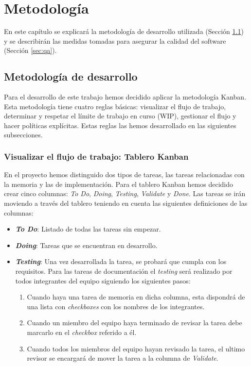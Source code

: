 \chapter{Metodología}\label{cap:metodologia}
En este capítulo se explicará la metodología de desarrollo utilizada (Sección \ref{cap:Kanban}) y se describirán las medidas tomadas para asegurar la calidad del software (Sección \ref{sec:qa}).

\section{Metodología de desarrollo}\label{cap:Kanban}
Para el desarrollo de este trabajo hemos decidido aplicar la metodología Kanban. Esta metodología tiene cuatro reglas básicas: visualizar el flujo de trabajo, determinar y respetar el límite de trabajo en curso (WIP), gestionar el flujo y hacer políticas explícitas. Estas reglas las hemos desarrollado en las siguientes subsecciones.

\subsection{Visualizar el flujo de trabajo: Tablero Kanban}\label{sec:flujoTrabajo}
En el proyecto hemos distinguido dos tipos de tareas, las tareas relacionadas con la memoria y las de implementación. Para el tablero Kanban hemos decidido crear cinco columnas: \textit{To Do}, \textit{Doing}, \textit{Testing}, \textit{Validate} y \textit{Done}.  Las tareas se irán moviendo a través del tablero teniendo en cuenta las siguientes definiciones de las columnas:
\begin{itemize}
  \item \textbf{\textit{To Do}}: Listado de todas las tareas sin empezar.
  \item \textbf{\textit{Doing}}: Tareas que se encuentran en desarrollo.
  \item \textbf{\textit{Testing}}: Una vez desarrollada la tarea, se probará que cumpla con los requisitos.
        Para las tareas de documentación el \textit{testing} será realizado por todos integrantes del equipo siguiendo los siguientes pasos:
        \begin{enumerate}
          \item Cuando haya una tarea de memoria en dicha columna, esta dispondrá de una lista con \textit{checkboxes} con los nombres de los integrantes.
          \item Cuando un miembro del equipo haya terminado de revisar la tarea debe marcarlo en el \textit{checkbox} referido a él.
          \item Cuando todos los miembros del equipo hayan revisado la tarea, el ultimo revisor se encargará de mover la tarea a la columna de \textit{Validate}.
        \end{enumerate}
\end{itemize}

